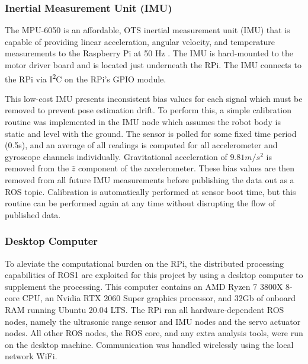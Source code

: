 \subsubsection{ Inertial Measurement Unit (IMU)}

The MPU-6050 is an affordable, OTS inertial measurement unit (IMU) that is capable of providing linear acceleration, angular velocity, and temperature measurements to the Raspberry Pi at 50 Hz \cite{mpu6050}.  The IMU is hard-mounted to the motor driver board and is located just underneath the RPi. The IMU connects to the RPi via I\textsuperscript{2}C on the RPi's GPIO module.

This low-cost IMU presents inconsistent bias values for each signal which must be removed to prevent pose estimation drift. To perform this, a simple calibration routine was implemented in the IMU node which assumes the robot body is static and level with the ground. The sensor is polled for some fixed time period (0.5s), and an average of all readings is computed for all accelerometer and gyroscope channels individually. Gravitational acceleration of $9.81 m/s^2$ is removed from the $\hat{z}$ component of the accelerometer. These bias values are then removed from all future IMU measurements before publishing the data out as a ROS topic. Calibration is automatically performed at sensor boot time, but this routine can be performed again at any time without disrupting the flow of published data.

\subsubsection{ Desktop Computer }
To aleviate the computational burden on the RPi, the distributed processing capabilities of ROS1 are exploited for this project by using a desktop computer to supplement the processing. This computer contains an AMD Ryzen 7 3800X 8-core CPU, an Nvidia RTX 2060 Super graphics processor, and 32Gb of onboard RAM running Ubuntu 20.04 LTS. The RPi ran all hardware-dependent ROS nodes, namely the ultrasonic range sensor and IMU nodes and the servo actuator nodes. All other ROS nodes, the ROS core, and any extra analysis tools, were run on the desktop machine. Communication was handled wirelessly using the local network WiFi.
